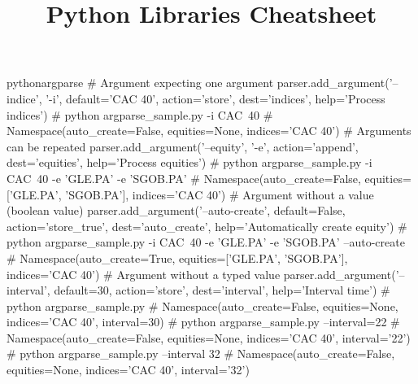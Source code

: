 \documentclass[10pt,a4paper]{article}
\title{\color{w3schools}Python Libraries Cheatsheet
}
\begin{document}
\maketitle
\small
\begin{multicols}{3}

\thispagestyle{empty}
\scriptsize

% 




\begin{codebox}{python}{argparse}
    # Argument expecting one argument
    parser.add_argument('--indice', '-i', default='CAC 40', action='store', dest='indices', help='Process indices')
    # python argparse_sample.py -i CAC\ 40
    # Namespace(auto_create=False, equities=None, indices='CAC 40')
    # Arguments can be repeated
    parser.add_argument('--equity', '-e', action='append', dest='equities', help='Process equities')
    # python argparse_sample.py -i CAC\ 40 -e 'GLE.PA' -e 'SGOB.PA'
    # Namespace(auto_create=False, equities=['GLE.PA', 'SGOB.PA'], indices='CAC 40')
    # Argument without a value (boolean value)
    parser.add_argument('--auto-create', default=False, action='store_true', dest='auto_create', help='Automatically create equity')
    # python argparse_sample.py -i CAC\ 40 -e 'GLE.PA' -e 'SGOB.PA' --auto-create
    # Namespace(auto_create=True, equities=['GLE.PA', 'SGOB.PA'], indices='CAC 40')
    # Argument without a typed value
    parser.add_argument('--interval', default=30, action='store', dest='interval', help='Interval time')
    # python argparse_sample.py
    # Namespace(auto_create=False, equities=None, indices='CAC 40', interval=30)
    # python argparse_sample.py --interval=22
    # Namespace(auto_create=False, equities=None, indices='CAC 40', interval='22')
    # python argparse_sample.py --interval 32
    # Namespace(auto_create=False, equities=None, indices='CAC 40', interval='32')

\end{codebox}


\AtNextBibliography{\footnotesize}
\printbibliography  
\end{multicols}
\end{document}
